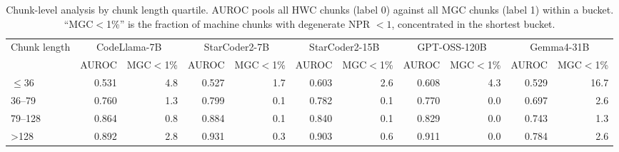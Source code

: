 \begin{table}[t]
\centering
\caption{Chunk-level analysis by chunk length quartile. AUROC pools all HWC chunks (label 0) against all MGC chunks (label 1) within a bucket. ``MGC$<$1\%'' is the fraction of machine chunks with degenerate NPR $<1$, concentrated in the shortest bucket.}
\label{tab:chunk-by-length}
\begin{tabular}{lrrrrrrrrrr}
\toprule
Chunk length & \multicolumn{2}{c}{CodeLlama-7B} & \multicolumn{2}{c}{StarCoder2-7B} & \multicolumn{2}{c}{StarCoder2-15B} & \multicolumn{2}{c}{GPT-OSS-120B} & \multicolumn{2}{c}{Gemma4-31B} \\
 & AUROC & MGC$<$1\% & AUROC & MGC$<$1\% & AUROC & MGC$<$1\% & AUROC & MGC$<$1\% & AUROC & MGC$<$1\% \\
\midrule
$\leq$36 & 0.531 & 4.8 & 0.527 & 1.7 & 0.603 & 2.6 & 0.608 & 4.3 & 0.529 & 16.7 \\
36--79 & 0.760 & 1.3 & 0.799 & 0.1 & 0.782 & 0.1 & 0.770 & 0.0 & 0.697 & 2.6 \\
79--128 & 0.864 & 0.8 & 0.884 & 0.1 & 0.840 & 0.1 & 0.829 & 0.0 & 0.743 & 1.3 \\
>128 & 0.892 & 2.8 & 0.931 & 0.3 & 0.903 & 0.6 & 0.911 & 0.0 & 0.784 & 2.6 \\
\bottomrule
\end{tabular}
\end{table}
